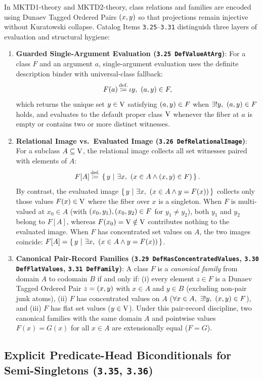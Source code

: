 In \textsf{MKTD1-theory} and \textsf{MKTD2-theory}, class relations and families are encoded using Dunaev Tagged Ordered Pairs $(x,y)$ so that projections remain injective without Kuratowski collapse. Catalog Items \texttt{3.25}--\texttt{3.31} distinguish three layers of evaluation and structural hygiene:
\begin{enumerate}
  \item \textbf{Guarded Single-Argument Evaluation (\texttt{3.25 DefValueAtArg})}:
  For a class $F$ and an argument $a$, single-argument evaluation uses the definite description binder with universal-class fallback:
  \[
  F(a) \,{\stackrel{{\textrm{def.}}}{\coloneqq}}\, \iota y,\ (a,y) \in F,
  \]
  which returns the unique set $y \in \mathrm{V}$ satisfying $(a,y) \in F$ when $\exists! y,\ (a,y) \in F$ holds, and evaluates to the default proper class $\mathrm{V}$ whenever the fiber at $a$ is empty or contains two or more distinct witnesses.
  \item \textbf{Relational Image vs.\ Evaluated Image (\texttt{3.26 DefRelationalImage})}:
  For a subclass $A \subseteq \mathrm{V}$, the relational image collects all set witnesses paired with elements of $A$:
  \[
  F[A] \,{\stackrel{{\textrm{def.}}}{\coloneqq}}\, \left\{\,y\ \middle|\ \exists x,\ (x \in A \land (x,y) \in F)\,\right\}.
  \]
  By contrast, the evaluated image $\left\{\,y\ \middle|\ \exists x,\ (x \in A \land y = F(x))\,\right\}$ collects only those values $F(x) \in \mathrm{V}$ where the fiber over $x$ is a singleton. When $F$ is multi-valued at $x_0 \in A$ (with $(x_0,y_1), (x_0,y_2) \in F$ for $y_1 \neq y_2$), both $y_1$ and $y_2$ belong to $F[A]$, whereas $F(x_0) = \mathrm{V} \notin \mathrm{V}$ contributes nothing to the evaluated image. When $F$ has concentrated set values on $A$, the two images coincide: $F[A] = \left\{\,y\ \middle|\ \exists x,\ (x \in A \land y = F(x))\,\right\}$.
  \item \textbf{Canonical Pair-Record Families (\texttt{3.29 DefHasConcentratedValues}, \texttt{3.30 DefFlatValues}, \texttt{3.31 DefFamily})}:
  A class $F$ is a \emph{canonical family} from domain $A$ to codomain $B$ if and only if: (i) every element $z \in F$ is a Dunaev Tagged Ordered Pair $z = (x,y)$ with $x \in A$ and $y \in B$ (excluding non-pair junk atoms), (ii) $F$ has concentrated values on $A$ ($\forall x \in A,\ \exists! y,\ (x,y) \in F$), and (iii) $F$ has flat set values ($y \in \mathrm{V}$). Under this pair-record discipline, two canonical families with the same domain $A$ and pointwise values $F(x) = G(x)$ for all $x \in A$ are extensionally equal ($F = G$).
\end{enumerate}

\subsection{Explicit Predicate-Head Biconditionals for Semi-Singletons (\texttt{3.35}, \texttt{3.36})}
\label{subsec:semisingleton_export_heads}

